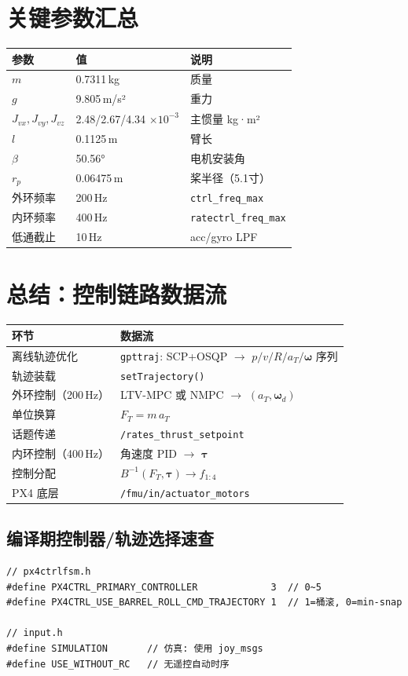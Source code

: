 \documentclass[UTF8, a4paper, 11pt]{ctexart}
\newcommand{\bw}{\boldsymbol{\omega}}
\begin{document}
\section{关键参数汇总}

\begin{center}
\begin{tabular}{lll}
\toprule
参数 & 值 & 说明 \\
\midrule
$m$ & 0.7311\,kg & 质量 \\
$g$ & 9.805\,m/s² & 重力 \\
$J_{vx},J_{vy},J_{vz}$ & 2.48/2.67/4.34 $\times10^{-3}$ & 主惯量 kg·m² \\
$l$ & 0.1125\,m & 臂长 \\
$\beta$ & 50.56° & 电机安装角 \\
$r_p$ & 0.06475\,m & 桨半径（5.1寸）\\
外环频率 & 200\,Hz & \texttt{ctrl\_freq\_max} \\
内环频率 & 400\,Hz & \texttt{ratectrl\_freq\_max} \\
低通截止 & 10\,Hz & acc/gyro LPF \\
\bottomrule
\end{tabular}
\end{center}

\section{总结：控制链路数据流}

\begin{center}
\begin{tabular}{ll}
\toprule
环节 & 数据流 \\
\midrule
离线轨迹优化 & \texttt{gpttraj}: SCP+OSQP $\to$ $p/v/R/a_T/\bw$ 序列 \\
轨迹装载 & \texttt{setTrajectory()} \\
外环控制（200\,Hz） & LTV-MPC 或 NMPC $\to$ $(a_T, \bw_d)$ \\
单位换算 & $F_T = m\,a_T$ \\
话题传递 & \texttt{/rates\_thrust\_setpoint} \\
内环控制（400\,Hz） & 角速度 PID $\to$ $\boldsymbol{\tau}$ \\
控制分配 & $B^{-1}(F_T,\boldsymbol{\tau}) \to f_{1:4}$ \\
PX4 底层 & \texttt{/fmu/in/actuator\_motors} \\
\bottomrule
\end{tabular}
\end{center}

\subsection*{编译期控制器/轨迹选择速查}

\begin{lstlisting}
// px4ctrlfsm.h
#define PX4CTRL_PRIMARY_CONTROLLER             3  // 0~5
#define PX4CTRL_USE_BARREL_ROLL_CMD_TRAJECTORY 1  // 1=桶滚, 0=min-snap

// input.h
#define SIMULATION       // 仿真: 使用 joy_msgs
#define USE_WITHOUT_RC   // 无遥控自动时序
\end{lstlisting}
\end{document}
